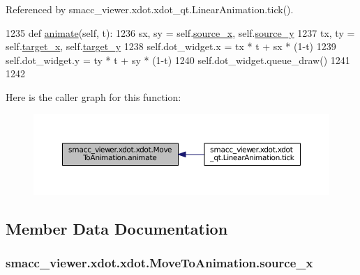 Referenced by smacc\+\_\+viewer.\+xdot.\+xdot\+\_\+qt.\+Linear\+Animation.\+tick().


\begin{DoxyCode}
1235     \textcolor{keyword}{def }\hyperlink{classsmacc__viewer_1_1xdot_1_1xdot_1_1MoveToAnimation_aa0c81242a1d980cf2ffb4d2f3179f8c9}{animate}(self, t):
1236         sx, sy = self.\hyperlink{classsmacc__viewer_1_1xdot_1_1xdot_1_1MoveToAnimation_af362b035e9461c4036f756bba60a5e3b}{source\_x}, self.\hyperlink{classsmacc__viewer_1_1xdot_1_1xdot_1_1MoveToAnimation_a40825c7f41d700635425cd40fca1f6a4}{source\_y}
1237         tx, ty = self.\hyperlink{classsmacc__viewer_1_1xdot_1_1xdot_1_1MoveToAnimation_a5ea1e33ebe1d6ab9bfa86a336b3a2524}{target\_x}, self.\hyperlink{classsmacc__viewer_1_1xdot_1_1xdot_1_1MoveToAnimation_af354769fa237bb3f62cf02d9ca92da4f}{target\_y}
1238         self.dot\_widget.x = tx * t + sx * (1-t)
1239         self.dot\_widget.y = ty * t + sy * (1-t)
1240         self.dot\_widget.queue\_draw()
1241 
1242 
\end{DoxyCode}


Here is the caller graph for this function\+:
\nopagebreak
\begin{figure}[H]
\begin{center}
\leavevmode
\includegraphics[width=350pt]{classsmacc__viewer_1_1xdot_1_1xdot_1_1MoveToAnimation_aa0c81242a1d980cf2ffb4d2f3179f8c9_icgraph}
\end{center}
\end{figure}




\subsection{Member Data Documentation}
\subsubsection[{\texorpdfstring{source\+\_\+x}{source_x}}]{\setlength{\rightskip}{0pt plus 5cm}smacc\+\_\+viewer.\+xdot.\+xdot.\+Move\+To\+Animation.\+source\+\_\+x}\hypertarget{classsmacc__viewer_1_1xdot_1_1xdot_1_1MoveToAnimation_af362b035e9461c4036f756bba60a5e3b}{}\label{classsmacc__viewer_1_1xdot_1_1xdot_1_1MoveToAnimation_af362b035e9461c4036f756bba60a5e3b}



